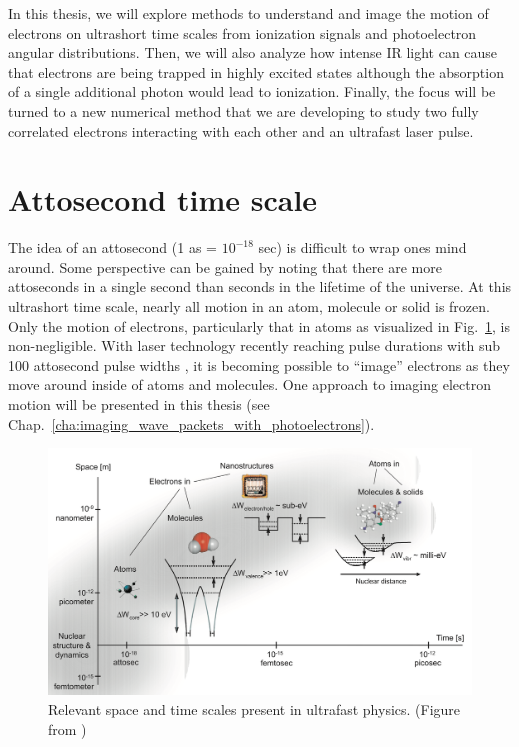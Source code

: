 In this thesis, we will explore methods to understand and image the motion of electrons on ultrashort time scales from ionization signals and photoelectron angular distributions. Then, we will also analyze how intense IR light can cause that electrons are being trapped in highly excited states although the absorption of a single additional photon would lead to ionization. Finally, the focus will be turned to a new numerical method that we are developing to study two fully correlated electrons interacting with each other and an ultrafast laser pulse. 

\section{Attosecond time scale}
The idea of an attosecond (1 as = $10^{-18}$ sec) is difficult to wrap ones mind around. Some perspective can be gained by noting that there are more attoseconds in a single second than seconds in the lifetime of the universe. At this ultrashort time scale, nearly all motion in an atom, molecule or solid is frozen. Only the motion of electrons, particularly that in atoms as visualized in Fig.~\ref{fig:time_scales}, is non-negligible. With laser technology recently reaching pulse durations with sub 100 attosecond pulse widths \cite{zhao2012,chen2014}, it is becoming possible to ``image'' electrons as they move around inside of atoms and molecules. One approach to imaging electron motion will be presented in this thesis (see  Chap.~\ref{cha:imaging_wave_packets_with_photoelectrons}).

\begin{figure}[!ht]
\centering
\includegraphics[width=0.8\columnwidth]{figs/Intro/time_scales.png}
\caption{\label{fig:time_scales} Relevant space and time scales present in ultrafast physics. (Figure from \cite{krausz2009})
}
\end{figure}

